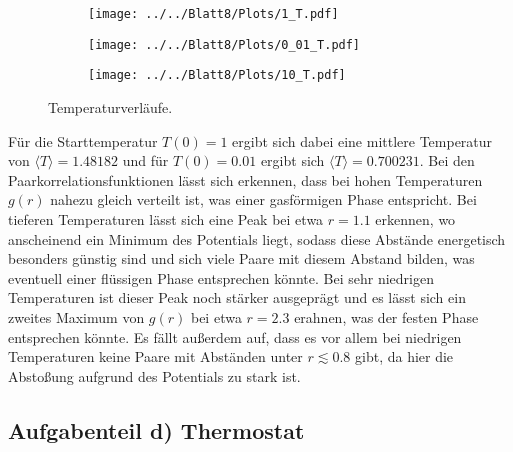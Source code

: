 \begin{figure}[H]
\begin{subfigure}[c]{0.5\textwidth}
\texttt{[image: ../../Blatt8/Plots/1\_T.pdf]}
\label{fig:T_1}
\end{subfigure}
\begin{subfigure}[c]{0.5\textwidth}
\texttt{[image: ../../Blatt8/Plots/0\_01\_T.pdf]}
\label{fig:T_0_01}
\end{subfigure}
\begin{subfigure}[c]{0.5\textwidth}
\texttt{[image: ../../Blatt8/Plots/10\_T.pdf]}
\label{fig:T_10}
\end{subfigure}
\caption{Temperaturverläufe.}
\label{fig:T}
\end{figure}

Für die Starttemperatur $T(0)=1$ ergibt sich dabei eine mittlere Temperatur von $\langle T \rangle =1.48182$ und für
$T(0)=0.01$ ergibt sich $\langle T \rangle =0.700231$.
Bei den Paarkorrelationsfunktionen lässt sich erkennen, dass bei hohen Temperaturen $g(r)$ nahezu gleich verteilt ist, was einer gasförmigen Phase entspricht. Bei tieferen Temperaturen lässt sich eine Peak bei etwa $r=1.1$ erkennen, wo anscheinend ein Minimum des Potentials liegt, sodass diese Abstände energetisch besonders günstig sind und sich viele Paare mit diesem Abstand bilden, was eventuell einer flüssigen Phase entsprechen könnte.
Bei sehr niedrigen Temperaturen ist dieser Peak noch stärker ausgeprägt und es lässt sich ein zweites Maximum von $g(r)$ bei etwa
$r=2.3$ erahnen, was der festen Phase entsprechen könnte. Es fällt außerdem auf, dass es vor allem bei niedrigen Temperaturen keine Paare mit Abständen unter $r\lesssim 0.8$ gibt, da hier die Abstoßung aufgrund des Potentials zu stark ist.

\subsection*{Aufgabenteil d) Thermostat}

